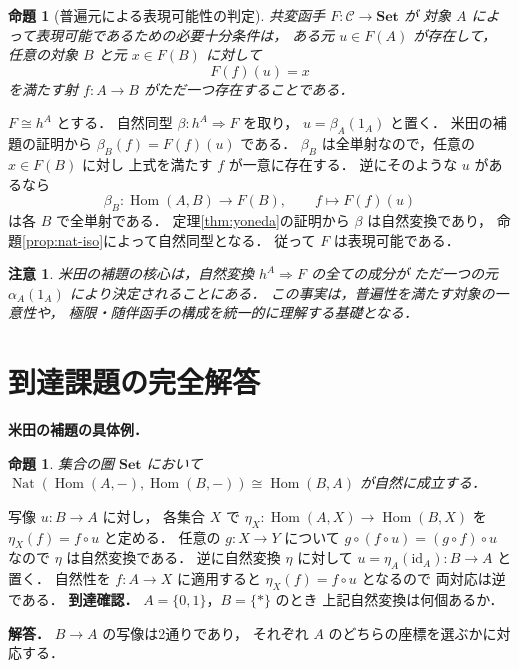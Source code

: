 \documentclass[a5paper,10pt,onecolumn]{jsarticle}
\makeatletter
\theoremstyle{mathnotetheorem}
\newtheorem{proposition}[theorem]{命題}
\newtheorem{remark}[theorem]{注意}
\renewcommand{\proofname}{証明}
\renewenvironment{proof}[1][\proofname]{%
  \par\pushQED{\qed}\normalfont\topsep4\p@\@plus2\p@\relax
  \trivlist\item[\hskip\labelsep\bfseries #1]\ignorespaces
}{\popQED\endtrivlist\@endpefalse}
\makeatother
\begin{document}
\begin{proposition}[普遍元による表現可能性の判定]
\label{prop:universal-element}
共変函手 $F:\mathcal C\to\mathbf{Set}$ が
対象 $A$ によって表現可能であるための必要十分条件は，
ある元 $u\in F(A)$ が存在して，
任意の対象 $B$ と元 $x\in F(B)$ に対して
\[
 F(f)(u)=x
\]
を満たす射 $f:A\to B$ がただ一つ存在することである．
\end{proposition}
\begin{proof}
$F\cong h^A$ とする．
自然同型 $\beta:h^A\Rightarrow F$ を取り，
$u=\beta_A(1_A)$ と置く．
米田の補題の証明から
$\beta_B(f)=F(f)(u)$ である．
$\beta_B$ は全単射なので，任意の $x\in F(B)$ に対し
上式を満たす $f$ が一意に存在する．
逆にそのような $u$ があるなら
\[
 \beta_B:\operatorname{Hom}(A,B)\to F(B),
 \qquad f\mapsto F(f)(u)
\]
は各 $B$ で全単射である．
定理\ref{thm:yoneda}の証明から $\beta$ は自然変換であり，
命題\ref{prop:nat-iso}によって自然同型となる．
従って $F$ は表現可能である．
\end{proof}

\begin{remark}
米田の補題の核心は，自然変換
$h^A\Rightarrow F$ の全ての成分が
ただ一つの元 $\alpha_A(1_A)$ により決定されることにある．
この事実は，普遍性を満たす対象の一意性や，
極限・随伴函手の構成を統一的に理解する基礎となる．
\end{remark}

\section{到達課題の完全解答}
\noindent\textbf{米田の補題の具体例．}
\begin{proposition}
集合の圏 $\mathbf{Set}$ において
$\operatorname{Nat}(\operatorname{Hom}(A,-),
\operatorname{Hom}(B,-))\cong\operatorname{Hom}(B,A)$
が自然に成立する．
\end{proposition}
\begin{proof}
写像 $u:B\to A$ に対し，
各集合 $X$ で
$\eta_X:\operatorname{Hom}(A,X)\to
\operatorname{Hom}(B,X)$ を
$\eta_X(f)=f\circ u$ と定める．
任意の $g:X\to Y$ について
$g\circ(f\circ u)=(g\circ f)\circ u$ なので
$\eta$ は自然変換である．
逆に自然変換 $\eta$ に対して
$u=\eta_A(\mathrm{id}_A):B\to A$ と置く．
自然性を $f:A\to X$ に適用すると
$\eta_X(f)=f\circ u$ となるので
両対応は逆である．
\end{proof}
\noindent\textbf{到達確認．}
$A=\{0,1\}$，$B=\{*\}$ のとき
上記自然変換は何個あるか．
\par\noindent\textbf{解答．}
$B\to A$ の写像は2通りであり，
それぞれ $A$ のどちらの座標を選ぶかに対応する．
\end{document}
